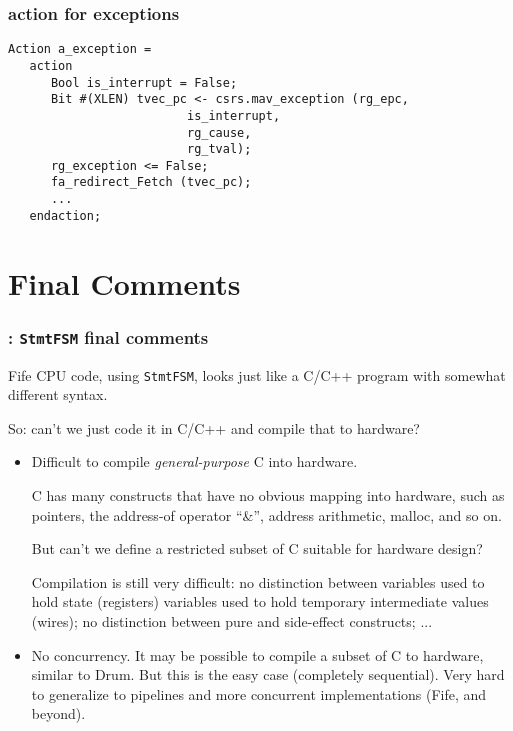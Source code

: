 \begin{frame}[fragile]
\frametitle{action for exceptions}

\footnotesize

\begin{minipage}{0.725\textwidth}
\begin{Verbatim}[frame=single, label=From src\_Drum/CPU.bsv]
   Action a_exception =
   action
      Bool is_interrupt = False;
      Bit #(XLEN) tvec_pc <- csrs.mav_exception (rg_epc,
						 is_interrupt,
						 rg_cause,
						 rg_tval);
      rg_exception <= False;
      fa_redirect_Fetch (tvec_pc);
      ...
   endaction;
\end{Verbatim}
\end{minipage}

\end{frame}


\section{Final Comments}

\begin{frame}[fragile]
\frametitle{{\BSV}: {\tt StmtFSM} final comments}

\footnotesize

Fife CPU code, using {\tt StmtFSM}, looks just like a C/C++ program
with somewhat different syntax.

\vspace{2ex}

So: can't we just code it in C/C++ and compile that to hardware?

\vspace{2ex}

\begin{itemize}
        
 \item Difficult to compile \emph{general-purpose} C into hardware.

       C has many constructs that have no obvious mapping into
       hardware, such as pointers, the address-of operator ``\&'',
       address arithmetic, malloc, and so on.

       But can’t we define a restricted subset of C suitable for
       hardware design?

       Compilation is still very difficult: no distinction between
       variables used to hold state (registers) {\vs} variables used
       to hold temporary intermediate values (wires); no distinction
       between pure and side-effect constructs; ...

 \item No concurrency.  It may be possible to compile a subset of C to
       hardware, similar to Drum.  But this is the easy case
       (completely sequential).  Very hard to generalize to pipelines
       and more concurrent implementations (Fife, and beyond).

\end{itemize}

\end{frame}






